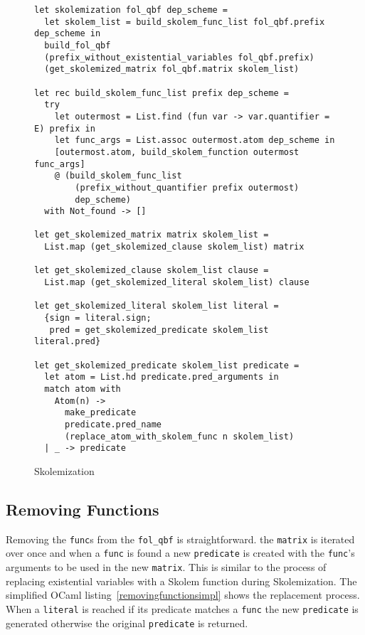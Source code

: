 \begin{figure}[H]
\caption{Skolemization}
\begin{CenteredBox}
\begin{lstlisting}[language=caml, label=skolemizationimpl]
let skolemization fol_qbf dep_scheme =
  let skolem_list = build_skolem_func_list fol_qbf.prefix dep_scheme in
  build_fol_qbf
  (prefix_without_existential_variables fol_qbf.prefix)
  (get_skolemized_matrix fol_qbf.matrix skolem_list)

let rec build_skolem_func_list prefix dep_scheme =
  try
    let outermost = List.find (fun var -> var.quantifier = E) prefix in
    let func_args = List.assoc outermost.atom dep_scheme in
    [outermost.atom, build_skolem_function outermost func_args]
    @ (build_skolem_func_list 
        (prefix_without_quantifier prefix outermost) 
        dep_scheme)
  with Not_found -> []

let get_skolemized_matrix matrix skolem_list =
  List.map (get_skolemized_clause skolem_list) matrix

let get_skolemized_clause skolem_list clause =
  List.map (get_skolemized_literal skolem_list) clause

let get_skolemized_literal skolem_list literal =
  {sign = literal.sign; 
   pred = get_skolemized_predicate skolem_list literal.pred}

let get_skolemized_predicate skolem_list predicate =
  let atom = List.hd predicate.pred_arguments in
  match atom with
    Atom(n) ->
      make_predicate
      predicate.pred_name
      (replace_atom_with_skolem_func n skolem_list)
  | _ -> predicate
\end{lstlisting}
\end{CenteredBox}
\end{figure}

\subsection{Removing Functions}
Removing the \texttt{func}s from the \texttt{fol\_qbf} is straightforward. the \texttt{matrix} is iterated over once and when a \texttt{func} is found a new \texttt{predicate} is created with the \texttt{func}'s arguments to be used in the new \texttt{matrix}. This is similar to the process of replacing existential variables with a Skolem function during Skolemization. The simplified OCaml listing~\ref{removingfunctionsimpl} shows the replacement process. When a \texttt{literal} is reached if its predicate matches a \texttt{func} the new \texttt{predicate} is generated otherwise the original \texttt{predicate} is returned.


